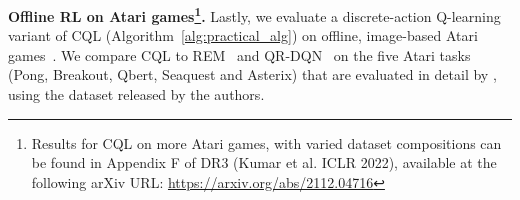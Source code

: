 \textbf{Offline RL on Atari games\footnote{Results for CQL on more Atari games, with varied dataset compositions can be found in Appendix F of DR3 (Kumar et al. ICLR 2022), available at the following arXiv URL: \url{https://arxiv.org/abs/2112.04716}}.} Lastly, we evaluate a discrete-action Q-learning variant of CQL (Algorithm~\ref{alg:practical_alg}) on offline, image-based Atari games~\citep{bellemare2013arcade}. We compare CQL to REM~\citep{agarwal2019optimistic} and QR-DQN~\citep{dabney2018distributional} on the five Atari tasks (Pong, Breakout, Qbert, Seaquest and Asterix) that are evaluated in detail by \citet{agarwal2019optimistic}, using the dataset released by the authors. 

